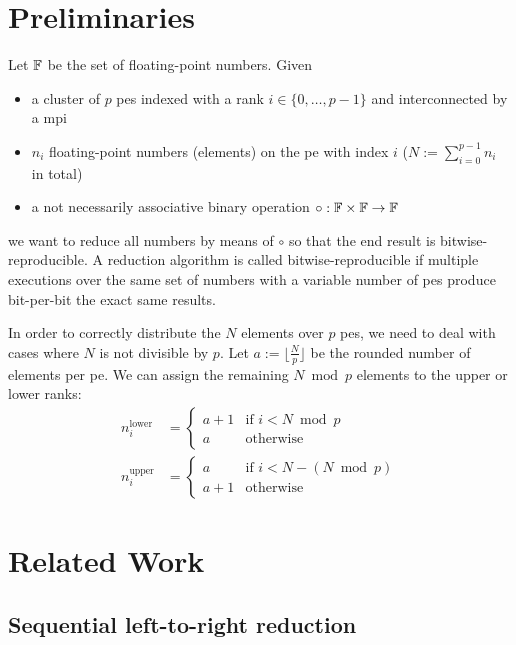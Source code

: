 \section{Preliminaries}
\label{sec:Preliminaries}
Let $\mathbb{F}$ be the set of floating-point numbers. Given
\begin{itemize}
\item a cluster of $p$ \glspl{pe} indexed with a rank $i \in \{0, \ldots, p - 1\}$ and interconnected by a \gls{mpi}
\item $n_i$ floating-point numbers (elements) on the \gls{pe} with index $i$ ($N := \sum_{i=0}^{p-1} n_i$ in total)
\item a not necessarily associative binary operation $\circ: \mathbb{F} \times \mathbb{F} \rightarrow \mathbb{F}$
\end{itemize}
we want to reduce all numbers by means of $\circ$ so that the end result is bitwise-reproducible.
A reduction algorithm is called bitwise-reproducible if multiple executions over the same set of numbers with a variable number of \glspl{pe} produce bit-per-bit the exact same results.

In order to correctly distribute the $N$ elements over $p$ \glspl{pe}, we need to deal with cases where $N$ is not divisible by $p$.
Let $a := \lfloor \tfrac{N}{p} \rfloor$ be the rounded number of elements per \gls{pe}.
We can assign the remaining $N \bmod p$ elements to the upper or lower ranks:
\begin{align}
\label{eq:lowerDistribution}
n_i^{\textrm{lower}} &= \begin{cases}
    a + 1 & \textrm{if } i < N \bmod p \\
    a & \textrm{otherwise}
\end{cases} \\
\label{eq:upperDistribution}
n_i^{\textrm{upper}} &= \begin{cases}
    a & \textrm{if } i < N - (N \bmod p) \\
    a + 1 & \textrm{otherwise}
\end{cases}
\end{align}

\section{Related Work}
\label{sec:RelatedWork}

\subsection{Sequential left-to-right reduction}
\label{sec:SequentialLeftToRightReduction}


